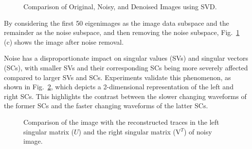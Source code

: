 \documentclass[
  journal,
]{IEEEtran}%
\begin{document}
\begin{figure}


\caption{\label{fig-svd_denoising_results}Comparison of Original, Noisy,
and Denoised Images using SVD.}

\end{figure}%

By considering the first 50 eigenimages as the image data subspace and
the remainder as the noise subspace, and then removing the noise
subspace, Fig.~\ref{fig-svd_denoising_results} (c) shows the image after
noise removal.

Noise has a disproportionate impact on singular values (SVs) and
singular vectors (SCs), with smaller SVs and their corresponding SCs
being more severely affected compared to larger SVs and SCs. Experiments
validate this phenomenon, as shown in
Fig.~\ref{fig-svd_matrices_comparison}, which depicts a 2-dimensional
representation of the left and right SCs. This highlights the contrast
between the slower changing waveforms of the former SCs and the faster
changing waveforms of the latter SCs.

\begin{figure}


\caption{\label{fig-svd_matrices_comparison}Comparison of the image with
the reconstructed traces in the left singular matrix (\(U\)) and the
right singular matrix (V\(^T\)) of noisy image.}

\end{figure}%
\end{document}
